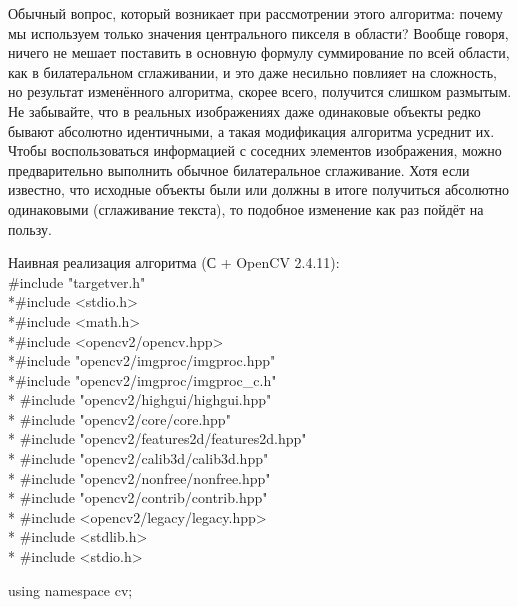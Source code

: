 \documentclass[a4paper,12pt]{article}
\begin{document}
Обычный вопрос, который возникает при рассмотрении этого алгоритма: почему мы используем только значения центрального пикселя в области? Вообще говоря, ничего не мешает поставить в основную формулу суммирование по всей области, как в билатеральном сглаживании, и это даже несильно повлияет на сложность, но результат изменённого алгоритма, скорее всего, получится слишком размытым. Не забывайте, что в реальных изображениях даже одинаковые объекты редко бывают абсолютно идентичными, а такая модификация алгоритма усреднит их. Чтобы воспользоваться информацией с соседних элементов изображения, можно предварительно выполнить обычное билатеральное сглаживание. Хотя если известно, что исходные объекты были или должны в итоге получиться абсолютно одинаковыми (сглаживание текста), то подобное изменение как раз пойдёт на пользу. 

Наивная реализация алгоритма (С + OpenCV 2.4.11):
\\\#include "targetver.h"
\\*\#include <stdio.h>
\\*\#include <math.h>
\\*\#include <opencv2/opencv.hpp>
\\*\#include "opencv2/imgproc/imgproc.hpp"
\\*\#include "opencv2/imgproc/imgproc\_c.h"
\\* \#include "opencv2/highgui/highgui.hpp"
\\* \#include "opencv2/core/core.hpp"
\\* \#include "opencv2/features2d/features2d.hpp"
\\* \#include "opencv2/calib3d/calib3d.hpp"
\\* \#include "opencv2/nonfree/nonfree.hpp"
\\* \#include "opencv2/contrib/contrib.hpp"
\\* \#include <opencv2/legacy/legacy.hpp>
\\* \#include <stdlib.h>
\\* \#include <stdio.h>

 using namespace cv;
\end{document}
